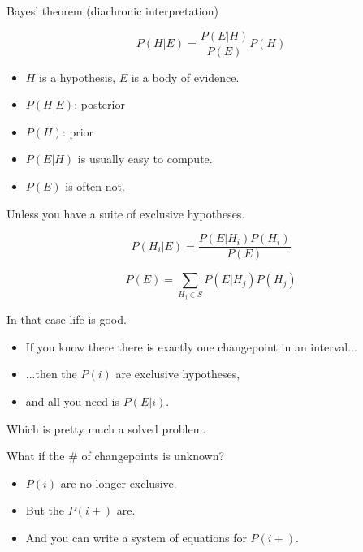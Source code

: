 \documentclass[pdf,letterpaper,allen]{prosper}
\begin{document}
\begin{slide}{}

Bayes' theorem (diachronic interpretation)

\[ P(H|E) = \frac{P(E|H)}{P(E)} P(H) \]

\begin{itemize}

\item $H$ is a hypothesis, $E$ is a body of evidence.

\item $P(H|E)$: posterior

\item $P(H)$: prior

\item $P(E|H)$ is usually easy to compute.

\item $P(E)$ is often not.

\end{itemize}


\end{slide}


\begin{slide}{}

Unless you have a suite of exclusive hypotheses.

\[ P(H_i|E) = \frac{P(E|H_i) P(H_i)}{P(E)} \]

\[ P(E) = \sum_{H_j \in S} P(E|H_j) P(H_j) \]

In that case life is good.

\end{slide}


\begin{slide}{}

\begin{itemize}

\item If you know there there is exactly one
changepoint in an interval...

\item ...then the $P(i)$ are exclusive hypotheses,

\item and all you need is $P(E|i)$.

\end{itemize}

Which is pretty much a solved problem.

\end{slide}


\begin{slide}{}

What if the \# of changepoints is unknown?

\begin{itemize}

\item $P(i)$ are no longer exclusive.

\item But the $P(i+)$ are.

\item And you can write a system of equations for $P(i+)$.

\end{itemize}

\end{slide}
\end{document}
